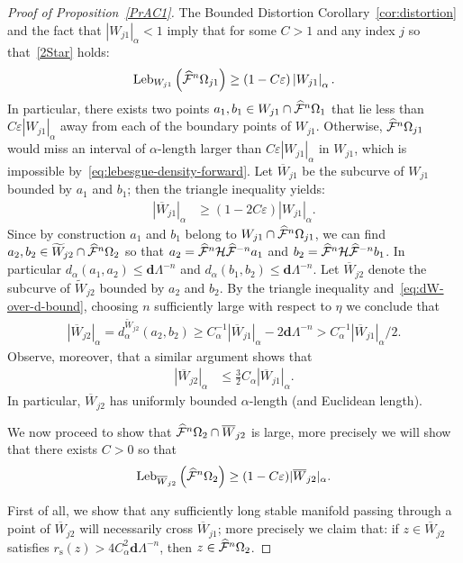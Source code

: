\documentclass[10pt]{amsart}
\theoremstyle{definition}\newtheorem{defi}[theo]{Definition}\newtheorem{rema}[theo]{Remark}\newtheorem{exam}[theo]{Example}\newtheorem{exem}[theo]{Example}\newtheorem{nota}[theo]{Notation}
\newcommand{\eps}{\varepsilon}
\newcommand{\stable}{\text{s}}
\newcommand{\bd}{\mathbf{d}}
\newcommand{\cm}{\mathcal{F}}
\newcommand{\hol}{\mathcal{H}}
\newcommand{\cmp}{\hat\cm}
\newcommand{\brW}{\overline{W}}
\newcommand{\tW}{\widetilde{W}}
\newcommand{\dadm}[1]{\dadmPrivate^{#1}}
\newcommand{\dadmPrivate}{d\adm}
\newcommand{\rs}{r_{\stable}}
\newcommand{\adm}{_{\alpha^{+}}}
\newcommand{\admName}{\alpha^{+}}
\newcommand{\Leb}{\textup{Leb}}
\renewcommand{\admName}{\alpha}
\renewcommand{\adm}{_{\alpha}}
\renewcommand{\dadm}{d\adm}
\let\oldhat\hat
\renewcommand*{\hat}[1]{\mathchoice{\widehat{#1}}{\widehat{#1}}{\oldhat{#1}}{\oldhat{#1}}}
\begin{document}
\begin{proof}[Proof of Proposition~\ref{PrAC1}]
The Bounded Distortion Corollary~\ref{cor:distortion} and the fact that $|W_{j1}|\adm < 1$ imply that for some $C > 1$ and any index $j$ so that~\eqref{2Star} holds:
\begin{align}\label{eq:lebesgue-density-forward}
\Leb_{W_{j1}}\left(\cmp^{n}\Omega_{j1}\right)\ge (1-C\eps)\left|W_{j1}\right|\adm.
\end{align}
In particular, there exists two points $a_{1},b_{1}\in W_{j1}\cap\cmp^{n}\Omega_{1}$ that lie less than $C\eps |W_{j1}|\adm$ away from each of the boundary points of $W_{j1}$. Otherwise, $\cmp^{n}\Omega_{j1}$ would miss an interval of $\admName$-length larger than $C\eps|W_{j1}|\adm$ in $W_{j1}$, which is impossible by~\eqref{eq:lebesgue-density-forward}. Let $\brW_{j1}$ be the subcurve of $W_{j1}$ bounded by $a_{1}$ and $b_{1}$; then the triangle inequality yields:
\begin{align}\label{eq:bar-w1j-length}
|\brW_{j1}|\adm &\ge (1-2C\eps)|W_{j1}|\adm.
\end{align}
Since by construction $a_{1}$ and $b_{1}$ belong to $W_{j1}\cap\cmp^{n}\Omega_{j1}$, we can find $a_{2}, b_{2}\in\tW_{j2}\cap\cmp^{n}\Omega_{2}$ so that $a_{2} = \cmp^{n}\hol\cmp^{-n}a_{1}$ and $b_{2} = \cmp^{n}\hol\cmp^{-n}b_{1}$. In particular $\dadm(a_{1},a_{2})\le \bd\Lambda^{-n}$ and $\dadm(b_{1},b_{2})\le \bd\Lambda^{-n}$. Let $\brW_{j2}$ denote the subcurve of $\tW_{j2}$ bounded by $a_{2}$ and $b_{2}$. By the triangle inequality and~\eqref{eq:dW-over-d-bound}, choosing $n$ sufficiently large with respect to $\eta$ we conclude that
\begin{align}\label{eq:Wj1-eta}
|\brW_{j2}|\adm = \dadm^{\tW_{j2}}(a_{2},b_{2})\ge C_{\alpha}^{-1}|\brW_{j1}|\adm-2\bd\Lambda^{-n} > C_{\alpha}^{-1}|\brW_{j1}|_{\alpha}/2.
\end{align}
Observe, moreover, that a similar argument shows that
\begin{align*}
|\brW_{j2}|\adm&\le\frac32C_{\alpha}|\brW_{j1}|\adm.
\end{align*}
In particular, $\brW_{j2}$ has uniformly bounded $\admName$-length (and Euclidean length).

We now proceed to show that $\cmp^{n}\Omega_{2}\cap \brW_{j2}$ is large, more precisely we will show that there exists $C > 0$ so that
\begin{align}\label{W2-Omega2}
\Leb_{\brW_{j2}}\left(\cmp^{n}\Omega_{2}\right)\ge (1-C\eps)|\brW_{j2}|\adm.
\end{align}

First of all, we show that any sufficiently long stable manifold passing through a point of $\brW_{j2}$ will necessarily cross $\brW_{j1}$; more precisely we claim that: if $z\in\brW_{j2}$ satisfies $\rs(z) >4 C^{2}_{\admName}\bd\Lambda^{-n}$, then $z\in\cmp^{n}\Omega_{2}$.


\end{proof}
\end{document}

